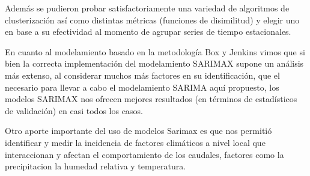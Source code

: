 \documentclass[12pt,oneside]{book}\usepackage[]{graphicx}\usepackage[]{color}
\theoremstyle{definition} %
\begin{document}


Además se pudieron probar satisfactoriamente una variedad de algoritmos de clusterización así como distintas métricas (funciones de disimilitud) y elegir uno en base a su efectividad al momento de agrupar series de tiempo estacionales.




En cuanto al modelamiento basado en la metodología Box y Jenkins vimos que si bien la correcta implementación del modelamiento SARIMAX supone un análisis más extenso, al considerar muchos más factores en su identificación, que el necesario para llevar a cabo el modelamiento SARIMA aquí propuesto, los modelos SARIMAX nos ofrecen mejores resultados (en términos de estadísticos de validación) en casi todos los casos. 





Otro aporte importante del uso de modelos Sarimax es que nos permitió identificar y medir la incidencia de factores climáticos a nivel local que interaccionan y afectan el comportamiento de los caudales, factores como la precipitacion la humedad relativa y temperatura.



\end{document}
